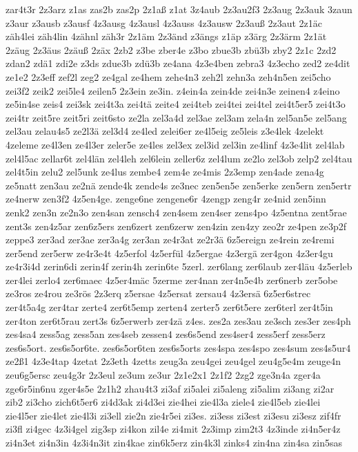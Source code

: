 {zar4t3r
2z3arz
z1as
zas2b
zas2p
2z1aß
z1at
3z4aub
2z3au2f3
2z3aug
2z3auk
3zaun
z3aur
z3ausb
z3ausf
4z3ausg
4z3ausl
4z3auss
4z3ausw
2z3auß
2z3aut
2z1äc
zäh4lei
zäh4lin
4zähnl
zäh3r
2z1äm
2z3änd
z3ängs
z1äp
z3ärg
2z3ärm
2z1ät
2zäug
2z3äus
2zäuß
2zäx
2zb2
z3be
zber4e
z3bo
zbue3b
zbü3b
zby2
2z1c
2zd2
zdan2
zdä1
zdi2e
z3ds
zdue3b
zdü3b
ze4ana
4z3e4ben
zebra3
4z3echo
zed2
ze4dit
ze1e2
2z3eff
zef2l
zeg2
ze4gal
ze4hem
zehe4n3
zeh2l
zehn3a
zeh4n5en
zei5cho
zei3f2
zeik2
zei5le4
zeilen5
2z3ein
ze3in.
z4ein4a
zein4de
zei4n3e
zeinen4
z4eino
ze5in4se
zeis4
zei3sk
zei4t3a
zei4tä
zeite4
zei4teb
zei4tei
zei4tel
zei4t5er5
zei4t3o
zei4tr
zeit5re
zeit5ri
zeit6sto
ze2la
zel3a4d
zel3ae
zel3am
zela4n
zel5an5e
zel5ang
zel3au
zelau4s5
ze2l3ä
zel3d4
ze4led
zelei6er
ze4l5eig
ze5leis
z3e4lek
4zelekt
4zeleme
ze4l3en
ze4l3er
zeler5e
ze4les
zel3ex
zel3id
zel3in
ze4linf
4z3e4lit
zel4lab
zel4l5ac
zellar6t
zel4län
zel4leh
zel6lein
zeller6z
zel4lum
ze2lo
zel3ob
zelp2
zel4tau
zel4t5in
zelu2
zel5unk
ze4lus
zembe4
zem4e
ze4mis
2z3emp
zen4ade
zena4g
ze5natt
zen3au
ze2nä
zende4k
zende4s
ze3nec
zen5en5e
zen5erke
zen5ern
zen5ertr
ze4nerw
zen3f2
4z5en4ge.
zenge6ne
zengene6r
4zengp
zeng4r
ze4nid
zen5inn
zenk2
zen3n
ze2n3o
zen4san
zensch4
zen4sem
zen4ser
zens4po
4z5entna
zent5rae
zent3s
zen4z5ar
zen6z5ers
zen6zert
zen6zerw
zen4zin
zen4zy
zeo2r
ze4pen
ze3p2f
zeppe3
zer3ad
zer3ae
zer3a4g
zer3an
ze4r3at
ze2r3ä
6z5ereign
ze4rein
ze4remi
zer5end
zer5erw
ze4r3e4t
4z5erfol
4z5erfül
4z5ergae
4z3ergä
zer4gon
4z3er4gu
ze4r3i4d
zerin6di
zerin4f
zerin4h
zerin6te
5zerl.
zer6lang
zer6laub
zer4läu
4z5erleb
zer4lei
zerlo4
zer6maec
4z5er4mäc
5zerme
zer4nan
zer4n5e4b
zer6nerb
zer5obe
ze3ros
ze4rou
ze3rös
2z3erq
z5ersae
4z5ersat
zersau4
4z3ersä
6z5er6strec
zer4t5a4g
zer4tar
zerte4
zer6t5emp
zerten4
zerter5
zer6t5ere
zer6terl
zer4t5in
zer4ton
zer6t5rau
zert3s
6z5erwerb
zer4zä
z4es.
zes2a
zes3au
ze3sch
zes3er
zes4ph
zes4sa4
zess5ag
zess5an
zes4seb
zessen4
zes6s5end
zes4ser4
zess5erf
zess5erz
zes6s5ort.
zes6s5or6te.
zes6s5or6ten
zes6s5orts
zes4spa
zes4spo
zes4sum
zes4s5ur4
ze2ß1
4z3e4tap
4zetat
2z3eth
4zetts
zeug3a
zeu4gei
zeu4gel
zeu4g5e4m
zeuge4n
zeu6g5ersc
zeu4g3r
2z3eul
ze3um
ze3ur
2z1e2x1
2z1f2
2zg2
zge3n4a
zger4a
zge6r5in6nu
zger4s5e
2z1h2
zhau4t3
zi3af
zi5alei
zi5aleng
zi5alim
zi3ang
zi2ar
zib2
zi3cho
zich6t5er6
zi4d3ak
zi4d3ei
zie4hei
zie4l3a
ziele4
zie4l5eb
zie4lei
zie4l5er
zie4let
zie4l3i
zi3ell
zie2n
zie4r5ei
zi3es.
zi3ess
zi3est
zi3esu
zi3esz
zif4fr
zi3fl
zi4gec
4z3i4gel
zig3sp
zi4kon
zil4e
zi4mit
2z3imp
zim2t3
4z3inde
zi4n5er4z
zi4n3et
zi4n3in
4z3i4n3it
zin4kae
zin6k5erz
zin4k3l
zinks4
zin4na
zin4sa
zin5sas
}
